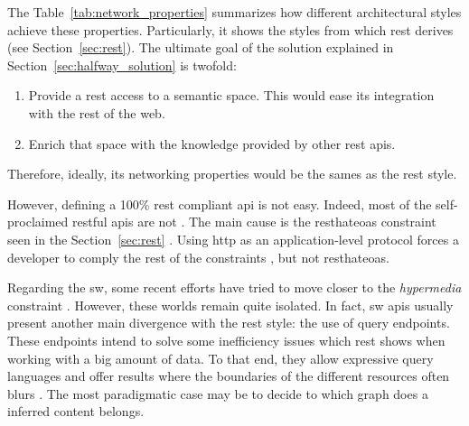 
The Table~\ref{tab:network_properties} summarizes how different architectural styles achieve these properties.
Particularly, it shows the styles from which \ac{rest} derives (see Section~\ref{sec:rest}).
The ultimate goal of the solution explained in Section~\ref{sec:halfway_solution} is twofold:
\begin{enumerate}
  \item Provide a \ac{rest} access to a semantic space.
       This would ease its integration with the rest of the web.
  \item Enrich that space with the knowledge provided by other \ac{rest} \acp{api}.
\end{enumerate}
Therefore, ideally, its networking properties would be the sames as the \ac{rest} style.


However, defining a 100\% \ac{rest} compliant \ac{api} is not easy.
Indeed, most of the self-proclaimed \ac{rest}ful \acp{api} are not \citep{house_how_2012}. %
The main cause is the \ac{resthateoas} constraint seen in the Section~\ref{sec:rest} \citep{fielding_rest_2008}.
Using \ac{http} as an application-level protocol forces a developer to comply the rest of the constraints \citet{moore_hypermedia_2010}, but not \ac{resthateoas}.


Regarding the \ac{sw}, some recent efforts have tried to move closer to the \emph{hypermedia} constraint \citep{steiner_fulfilling_2011,kjernsmo_necessity_2012}.
However, these worlds remain quite isolated.
In fact, \ac{sw} \acp{api} usually present another main divergence with the \ac{rest} style: the use of query endpoints.
These endpoints intend to solve some inefficiency issues which \ac{rest} shows when working with a big amount of data. %
To that end, they allow expressive query languages and offer results where the boundaries of the different resources often blurs \citep{wilde_restful_2009}.
The most paradigmatic case may be to decide to which graph does a inferred content belongs. %


